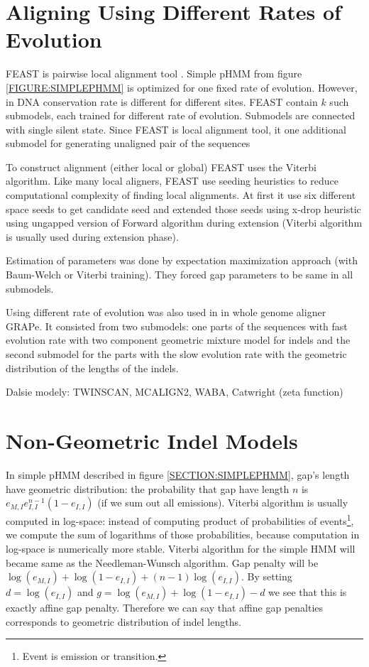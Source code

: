 \section{Aligning Using Different Rates of Evolution}
 

FEAST is pairwise local alignment tool \cite{FEAST2011}. Simple pHMM from figure
\ref{FIGURE:SIMPLEPHMM} is optimized for one fixed rate of evolution. However,
in DNA conservation rate is different for different sites.  FEAST contain $k$
such submodels, each trained for different rate of evolution. Submodels are
connected with single silent state. Since FEAST is local alignment tool, it one
additional submodel for generating unaligned pair of the sequences 

To construct alignment (either local or global) FEAST uses the Viterbi
algorithm. Like many local aligners, FEAST use seeding heuristics to reduce
computational complexity of finding local alignments.  At first it use six
different space seeds to get candidate seed and extended those seeds using
x-drop heuristic \cite{Altschul1997} using ungapped version of Forward algorithm during
extension (Viterbi algorithm is usually used during extension phase).

Estimation of parameters was done by expectation maximization approach (with
Baum-Welch or Viterbi training). They forced gap parameters to be same in all
submodels.

Using different rate of evolution was also used in \cite{Satija2010} in whole
genome aligner GRAPe. It consisted from two submodels: one parts of the
sequences with fast evolution rate with two component geometric mixture model
for indels and the second submodel for the parts with the slow evolution rate
with the geometric distribution of the lengths of the indels.

Dalsie modely: TWINSCAN, MCALIGN2, WABA, Catwright (zeta function)

\section{Non-Geometric Indel Models}
In simple pHMM described in figure \ref{SECTION:SIMPLEPHMM}, gap's length have
geometric distribution: the probability that gap have length $n$ is
$e_{M,I}e_{I,I}^{n-1}(1-e_{I,I})$ (if we sum out all emissions).  Viterbi
algorithm is usually computed in log-space: instead of computing product of
probabilities of events\footnote{Event is emission or transition.}, we compute
the sum of logarithms of those probabilities, because computation in log-space
is numerically more stable. Viterbi algorithm for the simple HMM
will became same as the Needleman-Wunsch algorithm.  Gap penalty will be
$\log(e_{M,I})+\log(1-e_{I,I})+(n-1)\log(e_{I,I})$. By setting $d=\log(e_{I,I})$
and $g=\log(e_{M,I})+\log(1-e_{I,I})-d$ we see that this is exactly affine gap
penalty. Therefore we can say that affine gap penalties corresponds to geometric
distribution of indel lengths.

